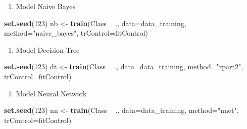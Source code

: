 \documentclass[]{article}
\newenvironment{Shaded}{\begin{snugshade}}{\end{snugshade}}
\newcommand{\DataTypeTok}[1]{\textcolor[rgb]{0.13,0.29,0.53}{#1}}
\newcommand{\DecValTok}[1]{\textcolor[rgb]{0.00,0.00,0.81}{#1}}
\newcommand{\KeywordTok}[1]{\textcolor[rgb]{0.13,0.29,0.53}{\textbf{#1}}}
\newcommand{\NormalTok}[1]{#1}
\newcommand{\OperatorTok}[1]{\textcolor[rgb]{0.81,0.36,0.00}{\textbf{#1}}}
\newcommand{\StringTok}[1]{\textcolor[rgb]{0.31,0.60,0.02}{#1}}
\providecommand{\tightlist}{%
  \setlength{\itemsep}{0pt}\setlength{\parskip}{0pt}}
\begin{document}
\begin{enumerate}
\def\labelenumi{\arabic{enumi}.}
\tightlist
\item
  Model Naive Bayes
\end{enumerate}

\begin{Shaded}
\begin{Highlighting}[]
\KeywordTok{set.seed}\NormalTok{(}\DecValTok{123}\NormalTok{)}
\NormalTok{nb <-}\StringTok{ }\KeywordTok{train}\NormalTok{(Class }\OperatorTok{~}\StringTok{ }\NormalTok{., }
            \DataTypeTok{data=}\NormalTok{data_training, }
            \DataTypeTok{method=}\StringTok{"naive_bayes"}\NormalTok{,}
            \DataTypeTok{trControl=}\NormalTok{fitControl)}
\end{Highlighting}
\end{Shaded}

\begin{enumerate}
\def\labelenumi{\arabic{enumi}.}
\setcounter{enumi}{1}
\tightlist
\item
  Model Decision Tree
\end{enumerate}

\begin{Shaded}
\begin{Highlighting}[]
\KeywordTok{set.seed}\NormalTok{(}\DecValTok{123}\NormalTok{)}
\NormalTok{dt <-}\StringTok{ }\KeywordTok{train}\NormalTok{(Class }\OperatorTok{~}\StringTok{ }\NormalTok{., }
            \DataTypeTok{data=}\NormalTok{data_training, }
            \DataTypeTok{method=}\StringTok{"rpart2"}\NormalTok{,}
            \DataTypeTok{trControl=}\NormalTok{fitControl)}
\end{Highlighting}
\end{Shaded}

\begin{enumerate}
\def\labelenumi{\arabic{enumi}.}
\setcounter{enumi}{2}
\tightlist
\item
  Model Neural Network
\end{enumerate}

\begin{Shaded}
\begin{Highlighting}[]
\KeywordTok{set.seed}\NormalTok{(}\DecValTok{123}\NormalTok{)}
\NormalTok{nn <-}\StringTok{ }\KeywordTok{train}\NormalTok{(Class }\OperatorTok{~}\StringTok{ }\NormalTok{., }
            \DataTypeTok{data=}\NormalTok{data_training, }
            \DataTypeTok{method=}\StringTok{"nnet"}\NormalTok{,}
            \DataTypeTok{trControl=}\NormalTok{fitControl)}
\end{Highlighting}
\end{Shaded}
\end{document}
